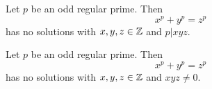 \begin{theorem}\label{theorem:FLT_case_two}
	Let $p$ be an odd regular prime. Then \[x^p+y^p=z^p\] has no solutions with $x,y,z \in \mathbb{Z}$ and $p | xyz$.
\end{theorem}


\begin{theorem}\label{FLT_regular}
	Let $p$ be an odd regular prime.  Then \[x^p+y^p=z^p\] has no solutions with $x,y,z \in \mathbb{Z}$ and $xyz \ne 0$.
\end{theorem}
